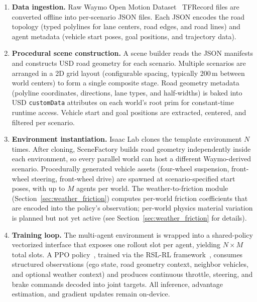 \begin{enumerate}[leftmargin=*, itemsep=2pt]
  \item \textbf{Data ingestion.}
  Raw Waymo Open Motion Dataset~\cite{Kan_2024_icra} TFRecord files are converted offline into per-scenario JSON files.
  Each JSON encodes the road topology (typed polylines for lane centers, road edges, and road lines) and agent metadata (vehicle start poses, goal positions, and trajectory data).

  \item \textbf{Procedural scene construction.}
  A scene builder reads the JSON manifests and constructs USD road geometry for each scenario.
  Multiple scenarios are arranged in a 2D grid layout (configurable spacing, typically 200\,m between world centers) to form a single composite stage.
  Road geometry metadata (polyline coordinates, directions, lane types, and half-widths) is baked into USD \texttt{customData} attributes on each world's root prim for constant-time runtime access.
  Vehicle start and goal positions are extracted, centered, and filtered per scenario.

  \item \textbf{Environment instantiation.}
  Isaac Lab clones the template environment $N$ times.
  After cloning, SceneFactory builds road geometry independently inside each environment, so every parallel world can host a different Waymo-derived scenario.
  Procedurally generated vehicle assets (four-wheel suspension, front-wheel steering, front-wheel drive) are spawned at scenario-specified start poses, with up to $M$ agents per world.
  The weather-to-friction module (Section~\ref{sec:weather_friction}) computes per-world friction coefficients that are encoded into the policy's observation; per-world physics material variation is planned but not yet active (see Section~\ref{sec:weather_friction} for details).



  \item \textbf{Training loop.}
  The multi-agent environment is wrapped into a shared-policy vectorized interface that exposes one rollout slot per agent, yielding $N \times M$ total slots.
  A PPO policy~\cite{schulman_proximal_2017}, trained via the RSL-RL framework~\cite{schwarke_rsl-rl_2025}, consumes structured observations (ego state, road geometry context, neighbor vehicles, and optional weather context) and produces continuous throttle, steering, and brake commands decoded into joint targets.
  All inference, advantage estimation, and gradient updates remain on-device.
\end{enumerate}

